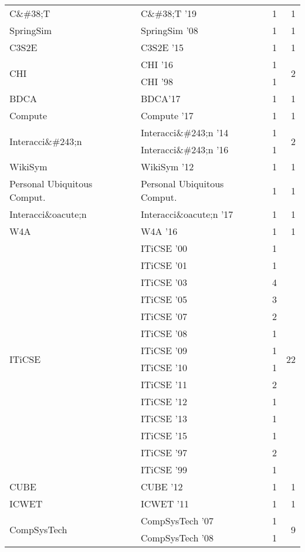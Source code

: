 \begin{table*}[t]
\begin{tabular}{llrr}
\multirow{1}{*}{C\&\#38;T } & C\&\#38;T '19 & 1 & \multirow{1}{*}{1}\\
\multirow{1}{*}{SpringSim } & SpringSim '08 & 1 & \multirow{1}{*}{1}\\
\multirow{1}{*}{C3S2E } & C3S2E '15 & 1 & \multirow{1}{*}{1}\\
\multirow{2}{*}{CHI } & CHI '16 & 1 & \multirow{2}{*}{2}\\
& CHI '98 & 1 &\\
\multirow{1}{*}{BDCA} & BDCA'17 & 1 & \multirow{1}{*}{1}\\
\multirow{1}{*}{Compute } & Compute '17 & 1 & \multirow{1}{*}{1}\\
\multirow{2}{*}{Interacci\&\#243;n } & Interacci\&\#243;n '14 & 1 & \multirow{2}{*}{2}\\
& Interacci\&\#243;n '16 & 1 &\\
\multirow{1}{*}{WikiSym } & WikiSym '12 & 1 & \multirow{1}{*}{1}\\
\multirow{1}{*}{Personal Ubiquitous Comput.} & Personal Ubiquitous Comput. & 1 & \multirow{1}{*}{1}\\
\multirow{1}{*}{Interacci\&oacute;n } & Interacci\&oacute;n '17 & 1 & \multirow{1}{*}{1}\\
\multirow{1}{*}{W4A } & W4A '16 & 1 & \multirow{1}{*}{1}\\
\multirow{14}{*}{ITiCSE } & ITiCSE '00 & 1 & \multirow{14}{*}{22}\\
& ITiCSE '01 & 1 &\\
& ITiCSE '03 & 4 &\\
& ITiCSE '05 & 3 &\\
& ITiCSE '07 & 2 &\\
& ITiCSE '08 & 1 &\\
& ITiCSE '09 & 1 &\\
& ITiCSE '10 & 1 &\\
& ITiCSE '11 & 2 &\\
& ITiCSE '12 & 1 &\\
& ITiCSE '13 & 1 &\\
& ITiCSE '15 & 1 &\\
& ITiCSE '97 & 2 &\\
& ITiCSE '99 & 1 &\\
\multirow{1}{*}{CUBE } & CUBE '12 & 1 & \multirow{1}{*}{1}\\
\multirow{1}{*}{ICWET } & ICWET '11 & 1 & \multirow{1}{*}{1}\\
\multirow{5}{*}{CompSysTech } & CompSysTech '07 & 1 & \multirow{5}{*}{9}\\
& CompSysTech '08 & 1 &\\

\end{tabular}
\end{table*}
